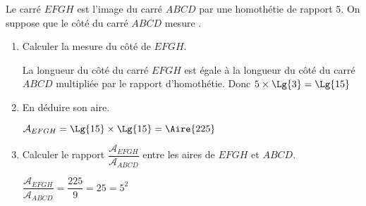     Le carré $EFGH$ est l'image du carré $ABCD$ par une homothétie de rapport $5$.
    On suppose que le côté du carré $ABCD$ mesure .

    \begin{enumerate}
        \item Calculer la mesure du côté de $EFGH$.

        {\color{red}La longueur du côté du carré $EFGH$ est égale à la longueur du côté du carré $ABCD$ multipliée par le rapport d'homothétie.
        Donc $5\times \Lg{3}=\Lg{15}$}
        \item En déduire son aire.

        {\color{red} $\mathcal{A}_{EFGH}=\Lg{15}\times \Lg{15} = \Aire{225}$}
        \item Calculer le rapport $\dfrac{\mathcal{A}_{EFGH}}{\mathcal{A}_{ABCD}}$ entre les aires de $EFGH$ et $ABCD$.

        {\color{red} $\dfrac{\mathcal{A}_{EFGH}}{\mathcal{A}_{ABCD}}=\dfrac{225}{9}=25=5^2$}
    \end{enumerate}
